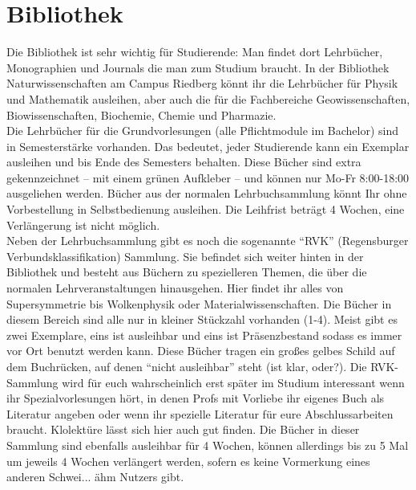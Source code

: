 \section{Bibliothek}
Die Bibliothek ist sehr wichtig für Studierende: Man findet dort Lehrbücher, Monographien und Journals die man zum Studium braucht. In der Bibliothek Naturwissenschaften am Campus Riedberg könnt ihr die Lehrbücher für Physik und Mathematik ausleihen, aber auch die für die Fachbereiche Geowissenschaften, Biowissenschaften, Biochemie, Chemie und Pharmazie.\\
Die Lehrbücher für die Grundvorlesungen (alle Pflichtmodule im Bachelor) sind in Semesterstärke vorhanden. Das bedeutet, jeder Studierende kann ein Exemplar ausleihen und bis Ende des Semesters behalten. Diese Bücher sind extra gekennzeichnet -- mit einem grünen Aufkleber -- und können nur Mo-Fr 8:00-18:00 ausgeliehen werden. Bücher aus der normalen Lehrbuchsammlung könnt Ihr ohne Vorbestellung in Selbstbedienung ausleihen. Die Leihfrist beträgt 4 Wochen, eine Verlängerung ist nicht möglich.\\
Neben der Lehrbuchsammlung gibt es noch die sogenannte \enquote{RVK}  (Regensburger Verbundsklassifikation) Sammlung. Sie befindet sich weiter hinten in der Bibliothek und besteht aus Büchern zu spezielleren Themen, die über die normalen Lehrveranstaltungen hinausgehen. Hier findet ihr alles von Supersymmetrie bis Wolkenphysik oder Materialwissenschaften. Die Bücher in diesem Bereich sind alle nur in kleiner Stückzahl vorhanden (1-4). Meist gibt es zwei Exemplare, eins ist ausleihbar und eins ist Präsenzbestand sodass es immer vor Ort benutzt werden kann. Diese Bücher tragen ein gro\ss es gelbes Schild auf dem Buchrücken, auf denen \enquote{nicht ausleihbar} steht (ist klar, oder?). Die RVK-Sammlung wird für euch wahrscheinlich erst später im Studium interessant wenn ihr Spezialvorlesungen hört, in denen Profs mit Vorliebe ihr eigenes Buch als Literatur angeben oder wenn ihr spezielle Literatur für eure Abschlussarbeiten braucht. Klolektüre lässt sich hier auch gut finden. Die Bücher in dieser Sammlung sind ebenfalls ausleihbar für 4 Wochen, können allerdings bis zu 5 Mal um jeweils 4 Wochen verlängert werden, sofern es keine Vormerkung eines anderen Schwei... ähm Nutzers gibt.\\
